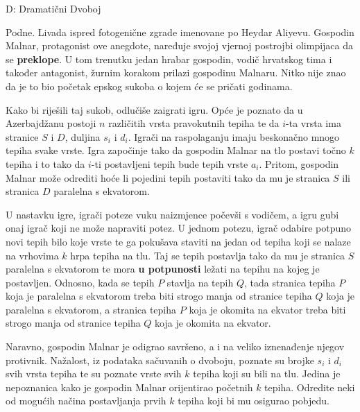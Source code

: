 
\begin{statement}[
  timelimit=1 s,
  memorylimit=512 MiB,
]{D: Dramatični Dvoboj}

Podne. Livada ispred fotogenične zgrade imenovane po Heydar Aliyevu. Gospodin
Malnar, protagonist ove anegdote, naređuje svojoj vjernoj postrojbi olimpijaca
da se \textbf{preklope}. U tom trenutku jedan hrabar gospodin, vodič hrvatskog
tima i također antagonist, žurnim korakom prilazi gospodinu Malnaru. Nitko nije
znao da je to bio početak epskog sukoba o kojem će se pričati godinama.

Kako bi riješili taj sukob, odlučiše zaigrati igru. Opće je poznato da u
Azerbajdžanu postoji $n$ različitih vrsta pravokutnih tepiha te da $i$-ta vrsta
ima stranice $S$ i $D$, duljina $s_i$ i $d_i$. Igrači na raspolaganju imaju
beskonačno mnogo tepiha svake vrste. Igra započinje tako da gospodin Malnar
na tlo postavi točno $k$ tepiha i to tako da $i$-ti postavljeni tepih bude
tepih vrste $a_i$. Pritom, gospodin Malnar može odrediti hoće li pojedini tepih
postaviti tako da mu je stranica $S$ ili stranica $D$ paralelna s ekvatorom.

U nastavku igre, igrači poteze vuku naizmjence počevši s vodičem, a igru gubi
onaj igrač koji ne može napraviti potez. U jednom potezu, igrač odabire potpuno
novi tepih bilo koje vrste te ga pokušava staviti na jedan od tepiha koji se
nalaze na vrhovima $k$ hrpa tepiha na tlu. Taj se tepih postavlja tako da mu
je stranica $S$ paralelna s ekvatorom te mora \textbf{u potpunosti} ležati na
tepihu na kojeg je postavljen. Odnosno, kada se tepih $P$ stavlja na tepih $Q$,
tada stranica tepiha $P$ koja je paralelna s ekvatorom treba biti strogo manja
od stranice tepiha $Q$ koja je paralelna s ekvatorom, a stranica tepiha $P$
koja je okomita na ekvator treba biti strogo manja od stranice tepiha $Q$ koja
je okomita na ekvator.

Naravno, gospodin Malnar je odigrao savršeno, a i na veliko iznenađenje njegov
protivnik. Nažalost, iz podataka sačuvanih o dvoboju, poznate su brojke $s_i$ i
$d_i$ svih vrsta tepiha te su poznate vrste svih $k$ tepiha koji su bili na tlu.
Jedina je nepoznanica kako je gospodin Malnar orijentirao početnih $k$ tepiha.
Odredite neki od mogućih načina postavljanja prvih $k$ tepiha koji bi mu osigurao
pobjedu.


\end{statement}
